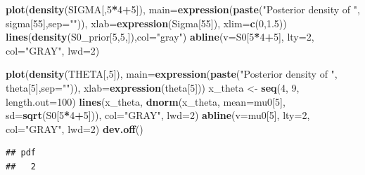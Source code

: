 \documentclass[12pt]{article}
\newenvironment{Shaded}{\begin{snugshade}}{\end{snugshade}}
\newcommand{\AttributeTok}[1]{\textcolor[rgb]{0.13,0.29,0.53}{#1}}
\newcommand{\DecValTok}[1]{\textcolor[rgb]{0.00,0.00,0.81}{#1}}
\newcommand{\FloatTok}[1]{\textcolor[rgb]{0.00,0.00,0.81}{#1}}
\newcommand{\FunctionTok}[1]{\textcolor[rgb]{0.13,0.29,0.53}{\textbf{#1}}}
\newcommand{\NormalTok}[1]{#1}
\newcommand{\OtherTok}[1]{\textcolor[rgb]{0.56,0.35,0.01}{#1}}
\newcommand{\SpecialCharTok}[1]{\textcolor[rgb]{0.81,0.36,0.00}{\textbf{#1}}}
\newcommand{\StringTok}[1]{\textcolor[rgb]{0.31,0.60,0.02}{#1}}
\begin{document}
\begin{Shaded}
\begin{Highlighting}[]
\FunctionTok{plot}\NormalTok{(}\FunctionTok{density}\NormalTok{(SIGMA[,}\DecValTok{5}\SpecialCharTok{*}\DecValTok{4}\SpecialCharTok{+}\DecValTok{5}\NormalTok{]), }
     \AttributeTok{main=}\FunctionTok{expression}\NormalTok{(}\FunctionTok{paste}\NormalTok{(}\StringTok{"Posterior density of "}\NormalTok{, sigma[}\DecValTok{55}\NormalTok{],}\AttributeTok{sep=}\StringTok{""}\NormalTok{)), }
     \AttributeTok{xlab=}\FunctionTok{expression}\NormalTok{(Sigma[}\DecValTok{55}\NormalTok{]), }\AttributeTok{xlim=}\FunctionTok{c}\NormalTok{(}\DecValTok{0}\NormalTok{,}\FloatTok{1.5}\NormalTok{))}
\FunctionTok{lines}\NormalTok{(}\FunctionTok{density}\NormalTok{(S0\_prior[}\DecValTok{5}\NormalTok{,}\DecValTok{5}\NormalTok{,]),}\AttributeTok{col=}\StringTok{"gray"}\NormalTok{)}
\FunctionTok{abline}\NormalTok{(}\AttributeTok{v=}\NormalTok{S0[}\DecValTok{5}\SpecialCharTok{*}\DecValTok{4}\SpecialCharTok{+}\DecValTok{5}\NormalTok{], }\AttributeTok{lty=}\DecValTok{2}\NormalTok{, }\AttributeTok{col=}\StringTok{"GRAY"}\NormalTok{, }\AttributeTok{lwd=}\DecValTok{2}\NormalTok{)}

\FunctionTok{plot}\NormalTok{(}\FunctionTok{density}\NormalTok{(THETA[,}\DecValTok{5}\NormalTok{]), }
     \AttributeTok{main=}\FunctionTok{expression}\NormalTok{(}\FunctionTok{paste}\NormalTok{(}\StringTok{"Posterior density of "}\NormalTok{, theta[}\DecValTok{5}\NormalTok{],}\AttributeTok{sep=}\StringTok{""}\NormalTok{)), }
     \AttributeTok{xlab=}\FunctionTok{expression}\NormalTok{(theta[}\DecValTok{5}\NormalTok{]))}
\NormalTok{x\_theta }\OtherTok{\textless{}{-}} \FunctionTok{seq}\NormalTok{(}\DecValTok{4}\NormalTok{, }\DecValTok{9}\NormalTok{, }\AttributeTok{length.out=}\DecValTok{100}\NormalTok{)}
\FunctionTok{lines}\NormalTok{(x\_theta, }\FunctionTok{dnorm}\NormalTok{(x\_theta, }\AttributeTok{mean=}\NormalTok{mu0[}\DecValTok{5}\NormalTok{], }\AttributeTok{sd=}\FunctionTok{sqrt}\NormalTok{(S0[}\DecValTok{5}\SpecialCharTok{*}\DecValTok{4}\SpecialCharTok{+}\DecValTok{5}\NormalTok{])), }
      \AttributeTok{col=}\StringTok{"GRAY"}\NormalTok{, }\AttributeTok{lwd=}\DecValTok{2}\NormalTok{)}
\FunctionTok{abline}\NormalTok{(}\AttributeTok{v=}\NormalTok{mu0[}\DecValTok{5}\NormalTok{], }\AttributeTok{lty=}\DecValTok{2}\NormalTok{, }\AttributeTok{col=}\StringTok{"GRAY"}\NormalTok{, }\AttributeTok{lwd=}\DecValTok{2}\NormalTok{)}
\FunctionTok{dev.off}\NormalTok{()}
\end{Highlighting}
\end{Shaded}

\begin{verbatim}
## pdf 
##   2
\end{verbatim}
\end{document}
